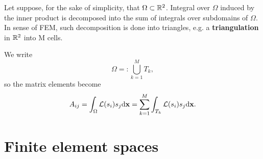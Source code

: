 \par Let suppose, for the sake of simplicity, that $\Omega \subset \mathbb{R}^2$. 
Integral over $\Omega$ induced by the inner product is decomposed into the sum of integrals over subdomains of $\Omega$. 
In sense of FEM, such decomposition is done into triangles, e.g. a \textbf{triangulation} in $\mathbb{R}^2$ into M cells.

We write
$$ \Omega =: \bigcup^M_{k=1} T_k, $$
so the matrix elements become
$$ A_{ij} = \int_\Omega \mathcal L(s_i)s_j \mathrm d \mathbf{x} = \sum_{k=1}^M \int_{T_k} \mathcal L(s_i)s_j \mathrm d \mathbf{x}.$$

\section{Finite element spaces}
